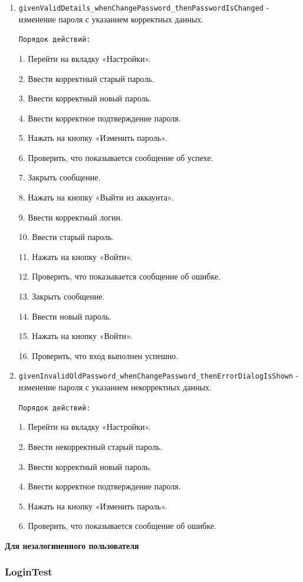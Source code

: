 \documentclass[a4paper, 14pt]{article}
\begin{document}
\begin{enumerate}
    \item \texttt{givenValidDetails\_whenChangePassword\_thenPasswordIsChanged} - изменение пароля с указанием корректных данных.

    \texttt{Порядок действий:}
    
    1. Перейти на вкладку «Настройки».
    
    2. Ввести корректный старый пароль.

    3. Ввести корректный новый пароль.

    4. Ввести корректное подтверждение пароля.

    5. Нажать на кнопку «Изменить пароль».

    6. Проверить, что показывается сообщение об успехе.

    7. Закрыть сообщение.

    8. Нажать на кнопку «Выйти из аккаунта».

    9. Ввести корректный логин.

    10. Ввести старый пароль.

    11. Нажать на кнопку «Войти».

    12. Проверить, что показывается сообщение об ошибке.

    13. Закрыть сообщение.

    14. Ввести новый пароль.

    15. Нажать на кнопку «Войти».

    16. Проверить, что вход выполнен успешно.
    
    \item \texttt{givenInvalidOldPassword\_whenChangePassword\_thenErrorDialogIsShown} - изменение пароля с указанием некорректных данных.

    \texttt{Порядок действий:}
    
    1. Перейти на вкладку «Настройки».
    
    2. Ввести некорректный старый пароль.

    3. Ввести корректный новый пароль.

    4. Ввести корректное подтверждение пароля.

    5. Нажать на кнопку «Изменить пароль».

    6. Проверить, что показывается сообщение об ошибке.
\end{enumerate}

\textbf{Для незалогиненного пользователя}
\subsubsection{LoginTest}
\end{document}
